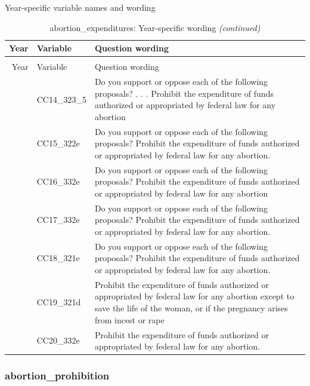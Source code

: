 \documentclass[
  12pt]{article}
\begin{document}
Year-specific variable names and
wording\begingroup\fontsize{11}{13}\selectfont

\begin{longtable}[t]{rl>{\raggedright\arraybackslash}p{10cm}}
\caption{\label{tab:unnamed-chunk-5}abortion\_expenditures: Year-specific wording}\\
\toprule
Year & Variable & Question wording\\
\midrule
\endfirsthead
\caption[]{abortion\_expenditures: Year-specific wording \textit{(continued)}}\\
\toprule
Year & Variable & Question wording\\
\midrule
\endhead

\endfoot
\bottomrule
\endlastfoot
2014 & CC14\_323\_5 & Do you support or oppose each of the following proposals? . . . Prohibit the expenditure of funds authorized or appropriated by federal law for any abortion\\
\addlinespace
2015 & CC15\_322e & Do you support or oppose each of the following proposals? Prohibit the expenditure of funds authorized or appropriated by federal law for any abortion.\\
\addlinespace
2016 & CC16\_332e & Do you support or oppose each of the following proposals? Prohibit the expenditure of funds authorized or appropriated by federal law for any abortion\\
\addlinespace
2017 & CC17\_332e & Do you support or oppose each of the following proposals? Prohibit the expenditure of funds authorized or appropriated by federal law for any abortion.\\
\addlinespace
2018 & CC18\_321e & Do you support or oppose each of the following proposals? Prohibit the expenditure of funds authorized or appropriated by federal law for any abortion.\\
\addlinespace
2019 & CC19\_321d & Prohibit the expenditure of funds authorized or appropriated by federal law for any abortion except to save the life of the woman, or if the pregnancy arises from incest or rape\\
\addlinespace
2020 & CC20\_332e & Prohibit the expenditure of funds authorized or appropriated by federal law for any abortion.\\*
\end{longtable}
\endgroup{}

\hypertarget{abortion_prohibition}{%
\subsubsection{abortion\_prohibition}\label{abortion_prohibition}}
\end{document}
